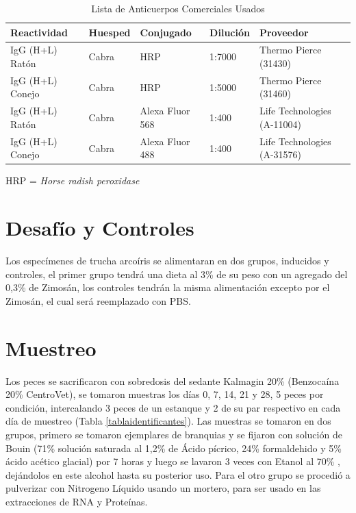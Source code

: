 \documentclass[12pt,letterpaper,oneside]{scrbook}
\begin{document}
\begin{table}[h!]
    \begin{center}
        \begin{threeparttable}
            \caption{Lista de Anticuerpos Comerciales Usados}\label{tabla:anticuerpos-comerciales}
                \begin{tabular}{l l l l l}
                \toprule
                Reactividad & Huesped & Conjugado & Dilución & Proveedor \\
                \midrule
                IgG (H+L) Ratón & Cabra & HRP & 1:7000 & Thermo Pierce (31430) \\
                IgG (H+L) Conejo & Cabra & HRP & 1:5000 & Thermo Pierce (31460) \\
                IgG (H+L) Ratón & Cabra & Alexa Fluor 568 & 1:400 & Life Technologies (A-11004) \\
                IgG (H+L) Conejo & Cabra & Alexa Fluor 488 & 1:400 & Life Technologies (A-31576) \\
                \bottomrule
                \end{tabular}
            \begin{tablenotes}
                \item *HRP = \emph{Horse radish peroxidase}
            \end{tablenotes}
        \end{threeparttable}
    \end{center}
\end{table}

\section{Desafío y Controles}

Los especímenes de trucha arcoíris se alimentaran en dos grupos,
inducidos y controles, el primer grupo tendrá una dieta al 3\% de su
peso con un agregado del 0,3\% de Zimosán, los controles tendrán la
misma alimentación excepto por el Zimosán, el cual será reemplazado con
PBS.

\section{Muestreo}

Los peces se sacrificaron con sobredosis del sedante Kalmagin 20\%
(Benzocaína 20\% CentroVet), se tomaron muestras los días 0, 7, 14, 21 y
28, 5 peces por condición, intercalando 3 peces de un estanque y 2 de su
par respectivo en cada día de muestreo (Tabla
\ref{tablaidentificantes}). Las muestras se tomaron en dos grupos,
primero se tomaron ejemplares de branquias y se fijaron con solución de
Bouin (71\% solución saturada al 1,2\% de Ácido pícrico, 24\%
formaldehido y 5\% ácido acético glacial) por 7 horas y luego se lavaron
3 veces con Etanol al 70\% , dejándolos en este alcohol hasta su
posterior uso. Para el otro grupo se procedió a pulverizar con Nitrogeno
Líquido usando un mortero, para ser usado en las extracciones de RNA y
Proteínas.
\end{document}
